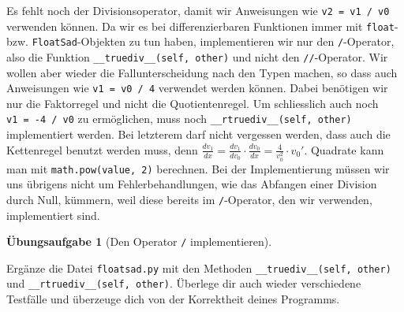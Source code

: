 \documentclass[
  a4paper,
  DIV=11]{scrreprt}
\theoremstyle{definition}
\newtheorem{exercise}{Übungsaufgabe}[chapter]
\theoremstyle{definition}
\theoremstyle{remark}
\begin{document}
Es fehlt noch der Divisionsoperator, damit wir Anweisungen wie
\texttt{v2\ =\ v1\ /\ v0} verwenden können. Da wir es bei
differenzierbaren Funktionen immer mit \texttt{float}- bzw.
\texttt{FloatSad}-Objekten zu tun haben, implementieren wir nur den
\texttt{/}-Operator, also die Funktion
\texttt{\_\_truediv\_\_(self,\ other)} und nicht den
\texttt{//}-Operator. Wir wollen aber wieder die Fallunterscheidung nach
den Typen machen, so dass auch Anweisungen wie \texttt{v1\ =\ v0\ /\ 4}
verwendet werden können. Dabei benötigen wir nur die Faktorregel und
nicht die Quotientenregel. Um schliesslich auch noch
\texttt{v1\ =\ -4\ /\ v0} zu ermöglichen, muss noch
\texttt{\_\_rtruediv\_\_(self,\ other)} implementiert werden. Bei
letzterem darf nicht vergessen werden, dass auch die Kettenregel benutzt
werden muss, denn
\(\frac{dv_1}{dx} = \frac{dv_1}{dv_0}\cdot \frac{dv_0}{dx} = \frac{4}{v_0^2}\cdot v_0'\).
Quadrate kann man mit \texttt{math.pow(value,\ 2)} berechnen. Bei der
Implementierung müssen wir uns übrigens nicht um Fehlerbehandlungen, wie
das Abfangen einer Division durch Null, kümmern, weil diese bereits im
\texttt{/}-Operator, den wir verwenden, implementiert sind.

\begin{exercise}[Den Operator \texttt{/}
implementieren]\protect\hypertarget{exr-ImplementTrueDiv}{}\label{exr-ImplementTrueDiv}

Ergänze die Datei \texttt{floatsad.py} mit den Methoden
\texttt{\_\_truediv\_\_(self,\ other)} und
\texttt{\_\_rtruediv\_\_(self,\ other)}. Überlege dir auch wieder
verschiedene Testfälle und überzeuge dich von der Korrektheit deines
Programms.

\end{exercise}
\end{document}
